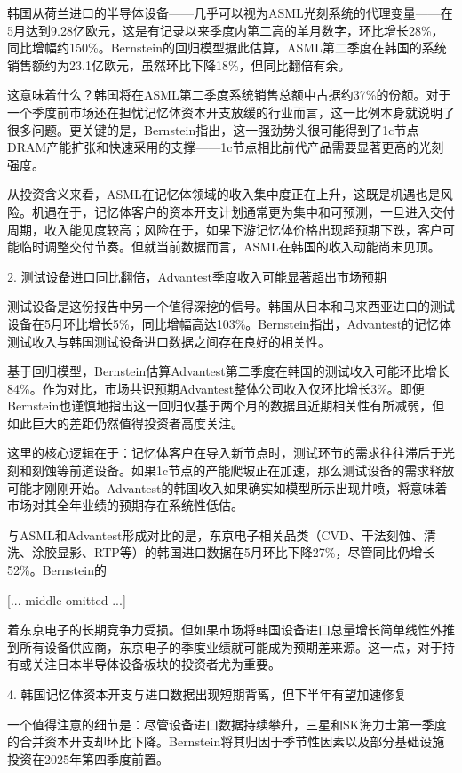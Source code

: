 \documentclass[11pt]{ctexart}
\begin{document}
韩国从荷兰进口的半导体设备——几乎可以视为ASML光刻系统的代理变量——在5月达到9.28亿欧元，这是有记录以来季度内第二高的单月数字，环比增长28\%，同比增幅约150\%。Bernstein的回归模型据此估算，ASML第二季度在韩国的系统销售额约为23.1亿欧元，虽然环比下降18\%，但同比翻倍有余。

这意味着什么？韩国将在ASML第二季度系统销售总额中占据约37\%的份额。对于一个季度前市场还在担忧记忆体资本开支放缓的行业而言，这一比例本身就说明了很多问题。更关键的是，Bernstein指出，这一强劲势头很可能得到了1c节点DRAM产能扩张和快速采用的支撑——1c节点相比前代产品需要显著更高的光刻强度。

从投资含义来看，ASML在记忆体领域的收入集中度正在上升，这既是机遇也是风险。机遇在于，记忆体客户的资本开支计划通常更为集中和可预测，一旦进入交付周期，收入能见度较高；风险在于，如果下游记忆体价格出现超预期下跌，客户可能临时调整交付节奏。但就当前数据而言，ASML在韩国的收入动能尚未见顶。

2. 测试设备进口同比翻倍，Advantest季度收入可能显著超出市场预期

测试设备是这份报告中另一个值得深挖的信号。韩国从日本和马来西亚进口的测试设备在5月环比增长5\%，同比增幅高达103\%。Bernstein指出，Advantest的记忆体测试收入与韩国测试设备进口数据之间存在良好的相关性。

基于回归模型，Bernstein估算Advantest第二季度在韩国的测试收入可能环比增长84\%。作为对比，市场共识预期Advantest整体公司收入仅环比增长3\%。即便Bernstein也谨慎地指出这一回归仅基于两个月的数据且近期相关性有所减弱，但如此巨大的差距仍然值得投资者高度关注。

这里的核心逻辑在于：记忆体客户在导入新节点时，测试环节的需求往往滞后于光刻和刻蚀等前道设备。如果1c节点的产能爬坡正在加速，那么测试设备的需求释放可能才刚刚开始。Advantest的韩国收入如果确实如模型所示出现井喷，将意味着市场对其全年业绩的预期存在系统性低估。

与ASML和Advantest形成对比的是，东京电子相关品类（CVD、干法刻蚀、清洗、涂胶显影、RTP等）的韩国进口数据在5月环比下降27\%，尽管同比仍增长52\%。Bernstein的

[... middle omitted ...]

着东京电子的长期竞争力受损。但如果市场将韩国设备进口总量增长简单线性外推到所有设备供应商，东京电子的季度业绩就可能成为预期差来源。这一点，对于持有或关注日本半导体设备板块的投资者尤为重要。

4. 韩国记忆体资本开支与进口数据出现短期背离，但下半年有望加速修复

一个值得注意的细节是：尽管设备进口数据持续攀升，三星和SK海力士第一季度的合并资本开支却环比下降。Bernstein将其归因于季节性因素以及部分基础设施投资在2025年第四季度前置。
\end{document}
